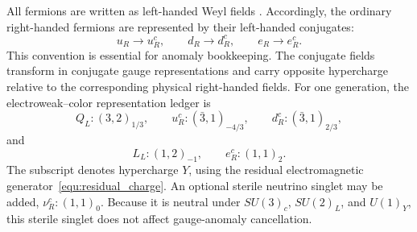 \documentclass[11pt]{article}
\begin{document}
All fermions are written as left-handed Weyl fields \cite{Weyl1929}. 
Accordingly, the ordinary right-handed fermions are represented by their left-handed conjugates:
\begin{equation}
u_R
\rightarrow
u_R^c,
\qquad
d_R
\rightarrow
d_R^c,
\qquad
e_R
\rightarrow
e_R^c.
\end{equation}
This convention is essential for anomaly bookkeeping. 
The conjugate fields transform in conjugate gauge representations and carry opposite hypercharge relative to the corresponding physical right-handed fields. For one generation, the electroweak--color representation ledger is
\begin{equation}
Q_L:
(3,2)_{1/3},
\qquad
u_R^c:
(\bar 3,1)_{-4/3},
\qquad
d_R^c:
(\bar 3,1)_{2/3},
\end{equation}
and
\begin{equation}
L_L:
(1,2)_{-1},
\qquad
e_R^c:
(1,1)_2.
\end{equation}
The subscript denotes hypercharge \(Y\), using the residual electromagnetic generator~\ref{equ:residual_charge}. An optional sterile neutrino singlet may be added, $\nu_R^c:(1,1)_0.$ Because it is neutral under \(SU(3)_c\), \(SU(2)_L\), and \(U(1)_Y\), this sterile singlet does not affect gauge-anomaly cancellation.
\end{document}
